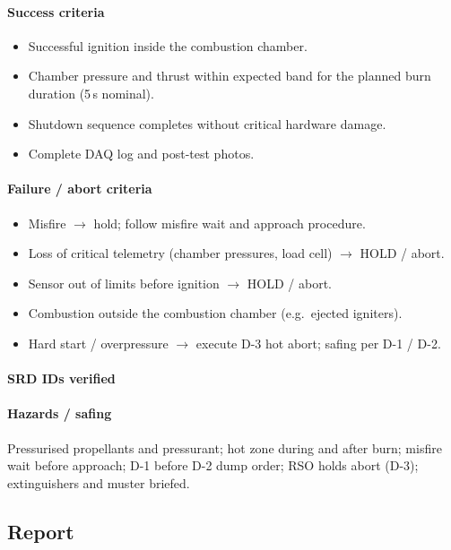 \paragraph{Success criteria}
\begin{itemize}
  \item Successful ignition inside the combustion chamber.
  \item Chamber pressure and thrust within expected band for the planned burn
    duration (5\,s nominal).
  \item Shutdown sequence completes without critical hardware damage.
  \item Complete DAQ log and post-test photos.
\end{itemize}

\paragraph{Failure / abort criteria}
\begin{itemize}
  \item Misfire $\rightarrow$ hold; follow misfire wait and approach procedure.
  \item Loss of critical telemetry (chamber pressures, load cell) $\rightarrow$
    HOLD / abort.
  \item Sensor out of limits before ignition $\rightarrow$ HOLD / abort.
  \item Combustion outside the combustion chamber (e.g.\ ejected igniters).
  \item Hard start / overpressure $\rightarrow$ execute D-3 hot abort; safing per
    D-1 / D-2.
\end{itemize}

\paragraph{SRD IDs verified}

\paragraph{Hazards / safing}
Pressurised propellants and pressurant; hot zone during and after burn; misfire
wait before approach; D-1 before D-2 dump order; RSO holds abort (D-3);
extinguishers and muster briefed.

\subsection*{Report}

